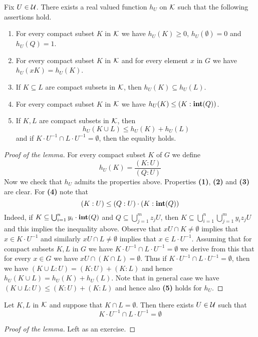 \begin{lemma}\label{lemma:approximationoncompactsets}
Fix $U\in {\mathcal U}$. There exists a real valued function $h_U$ on ${\mathcal K}$ such that the following assertions hold.
\begin{enumerate}[label=\emph{\textbf{(\arabic*)}}, leftmargin=3.0em]
\item For every compact subset $K$ in ${\mathcal K}$ we have $h_U(K)\geq 0$, $h_U(\emptyset) = 0$ and $h_U(Q)=1$.
\item For every compact subset $K$ in ${\mathcal K}$ and for every element $x$ in $G$ we have $h_U(xK) = h_U(K)$.
\item If $K\subseteq L$ are compact subsets in ${\mathcal K}$, then $h_U(K)\subseteq h_U(L)$.
\item For every compact subset $K$ in ${\mathcal K}$ we have $h_U(K) \leq \left(K:\mathbf{int}(Q)\right)$.
\item If $K, L$ are compact subsets in ${\mathcal K}$, then
$$h_U(K\cup L) \leq h_U(K) + h_U(L)$$
and if $K\cdot U^{-1}\cap L\cdot U^{-1} = \emptyset$, then the equality holds.
\end{enumerate}
\end{lemma}
\begin{proof}[Proof of the lemma]
For every compact subset $K$ of $G$ we define
$$h_U(K) = \frac{(K:U)}{(Q:U)}$$
Now we check that $h_U$ admits the properties above. Properties \textbf{(1)}, \textbf{(2)} and \textbf{(3)} are clear. For \textbf{(4)} note that
$$(K:U) \leq (Q:U)\cdot\left(K:\mathbf{int}(Q)\right)$$
Indeed, if $K\subseteq \bigcup_{i=1}^ny_i\cdot \mathbf{int}(Q)$ and $Q\subseteq \bigcup_{j=1}^mz_jU$, then $K\subseteq \bigcup_{i=1}^n\bigcup_{j=1}^my_iz_jU$ and this implies the inequality above. Observe that $xU \cap K \neq \emptyset$ implies that $x\in K\cdot U^{-1}$ and similarly $xU\cap L\neq \emptyset$ implies that $x\in L\cdot U^{-1}$. Assuming that for compact subsets $K, L$ in $G$ we have $ K\cdot U^{-1}\cap L\cdot U^{-1} = \emptyset$ we derive from this that for every $x\in G$ we have $xU\cap \left(K\cap L\right) = \emptyset$. Thus if $K\cdot U^{-1}\cap L\cdot U^{-1} = \emptyset$, then we have $(K\cup L:U) = (K:U)+(K:L)$ and hence $h_U(K\cup L) = h_U(K)+h_U(L)$. Note that in general case we have $(K\cup L:U) \leq (K:U)+(K:L)$ and hence also \textbf{(5)} holds for $h_U$.
\end{proof}

\begin{lemma}\label{lemma:compactsetsareseparablebyopens}
Let $K, L$ in ${\mathcal K}$ and suppose that $K\cap L =\emptyset$. Then there exists $U\in {\mathcal U}$ such that
$$K\cdot U^{-1}\cap L\cdot U^{-1} = \emptyset$$
\end{lemma}
\begin{proof}[Proof of the lemma]
Left as an exercise.
\end{proof}

